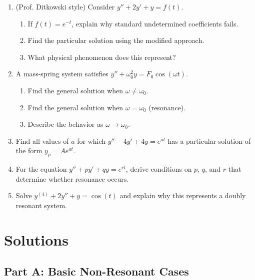 \documentclass[12pt]{article}
\begin{document}
\begin{enumerate}[resume]
\item (Prof. Ditkowski style) Consider $y'' + 2y' + y = f(t)$.
\begin{enumerate}[label=(\alph*)]
    \item If $f(t) = e^{-t}$, explain why standard undetermined coefficients fails.
    \item Find the particular solution using the modified approach.
    \item What physical phenomenon does this represent?
\end{enumerate}

\item A mass-spring system satisfies $y'' + \omega_0^2 y = F_0\cos(\omega t)$.
\begin{enumerate}[label=(\alph*)]
    \item Find the general solution when $\omega \neq \omega_0$.
    \item Find the general solution when $\omega = \omega_0$ (resonance).
    \item Describe the behavior as $\omega \to \omega_0$.
\end{enumerate}

\item Find all values of $a$ for which $y'' - 4y' + 4y = e^{at}$ has a particular solution of the form $y_p = Ae^{at}$.

\item For the equation $y'' + py' + qy = e^{rt}$, derive conditions on $p$, $q$, and $r$ that determine whether resonance occurs.

\item Solve $y^{(4)} + 2y'' + y = \cos(t)$ and explain why this represents a doubly resonant system.
\end{enumerate}

\newpage

\section*{Solutions}

\subsection*{Part A: Basic Non-Resonant Cases}
\end{document}
